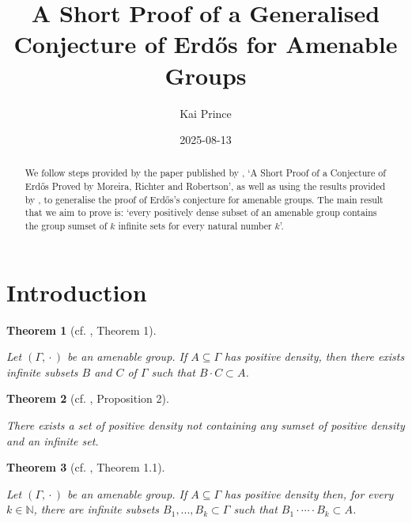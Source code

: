 \documentclass[
  british,
]{article}
\title{A Short Proof of a Generalised Conjecture of Erdős for Amenable
Groups}
\author{Kai Prince}
\date{2025-08-13}
\renewcommand*\contentsname{Table of contents}
\newcommand\contentsname{Table of contents}
\theoremstyle{definition}
\theoremstyle{plain}
\theoremstyle{plain}
\newtheorem{theorem}{Theorem}[section]
\theoremstyle{remark}
\newcommand{\AmenableGroup}{{\Gamma}}
\newcommand{\N}{\mathbb{N}}
\newcommand{\GroupOperation}[2]{{#1}\cdot{#2}}
\begin{document}
\maketitle
\begin{abstract}
We follow steps provided by the paper published by
, `A Short Proof of a
Conjecture of Erdős Proved by Moreira, Richter and Robertson', as well
as using the results provided by , to generalise the proof of Erdős's conjecture for amenable
groups. The main result that we aim to prove is: `every positively dense
subset of an amenable group contains the group sumset of \(k\) infinite
sets for every natural number \(k\)'.
\end{abstract}

\renewcommand*\contentsname{Table of contents}
{
\hypersetup{linkcolor=}
\setcounter{tocdepth}{3}
\tableofcontents
}

\section{Introduction}\label{introduction}

\begin{theorem}[cf. , Theorem
1]\protect\hypertarget{thm-GenErdosConjComb}{}\label{thm-GenErdosConjComb}

Let \((\AmenableGroup,\GroupOperation{}{})\) be an amenable group. If
\(A\subseteq\AmenableGroup\) has positive density, then there exists
infinite subsets \(B\) and \(C\) of \(\AmenableGroup\) such that
\(\GroupOperation{B}{C}\subset A\).

\end{theorem}

\begin{theorem}[cf. ,
Proposition
2]\protect\hypertarget{thm-GenErdosConjRel}{}\label{thm-GenErdosConjRel}

There exists a set of positive density not containing any sumset of
positive density and an infinite set.

\end{theorem}

\begin{theorem}[cf. ,
Theorem
1.1]\protect\hypertarget{thm-GenNErdosConjComb}{}\label{thm-GenNErdosConjComb}

Let \((\AmenableGroup,\GroupOperation{}{})\) be an amenable group. If
\(A\subseteq\AmenableGroup\) has positive density then, for every
\(k\in\N\), there are infinite subsets
\(B_1,...,B_k\subset\AmenableGroup\) such that
\(B_1\cdot\cdots\cdot B_k\subset A\).

\end{theorem}
\end{document}
